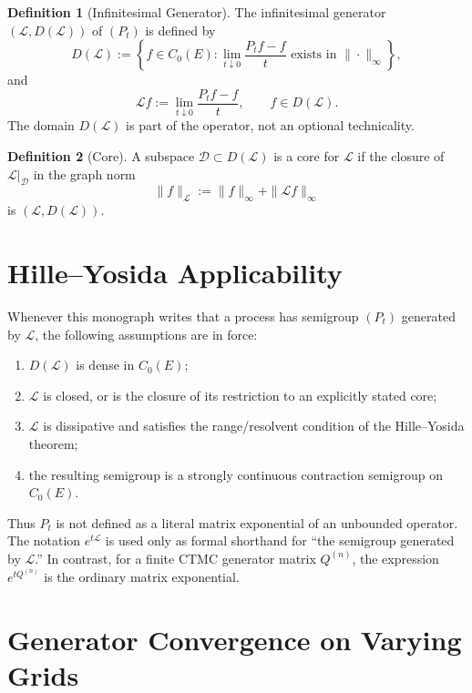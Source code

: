 \documentclass[11pt,a4paper,openany]{book}
\theoremstyle{definition}
\newtheorem{definition}{Definition}[chapter]
\theoremstyle{plain}
\theoremstyle{remark}
\newcommand{\1}{\mathbbm{1}}
\begin{document}
\begin{definition}[Infinitesimal Generator]
The infinitesimal generator $(\mathcal{L},D(\mathcal{L}))$ of $(P_t)$ is defined by
\[
D(\mathcal{L}) := \left\{ f\in C_0(E): \lim_{t\downarrow0}\frac{P_tf-f}{t}\text{ exists in }\|\cdot\|_\infty \right\},
\]
and
\[
\mathcal{L}f := \lim_{t\downarrow0}\frac{P_tf-f}{t}, \qquad f\in D(\mathcal{L}).
\]
The domain $D(\mathcal{L})$ is part of the operator, not an optional technicality.
\end{definition}

\begin{definition}[Core]
A subspace $\mathcal{D}\subset D(\mathcal{L})$ is a core for $\mathcal{L}$ if the closure of $\mathcal{L}|_{\mathcal{D}}$ in the graph norm
\[
\|f\|_{\mathcal{L}} := \|f\|_\infty + \|\mathcal{L}f\|_\infty
\]
is $(\mathcal{L},D(\mathcal{L}))$.
\end{definition}

\section{Hille--Yosida Applicability}

Whenever this monograph writes that a process has semigroup $(P_t)$ generated by $\mathcal{L}$, the following assumptions are in force:
\begin{enumerate}[label=(HY\arabic*)]
    \item $D(\mathcal{L})$ is dense in $C_0(E)$;
    \item $\mathcal{L}$ is closed, or is the closure of its restriction to an explicitly stated core;
    \item $\mathcal{L}$ is dissipative and satisfies the range/resolvent condition of the Hille--Yosida theorem;
    \item the resulting semigroup is a strongly continuous contraction semigroup on $C_0(E)$.
\end{enumerate}
Thus $P_t$ is not defined as a literal matrix exponential of an unbounded operator. The notation $e^{t\mathcal{L}}$ is used only as formal shorthand for ``the semigroup generated by $\mathcal{L}$.'' In contrast, for a finite CTMC generator matrix $Q^{(n)}$, the expression $e^{tQ^{(n)}}$ is the ordinary matrix exponential.

\section{Generator Convergence on Varying Grids}
\end{document}

